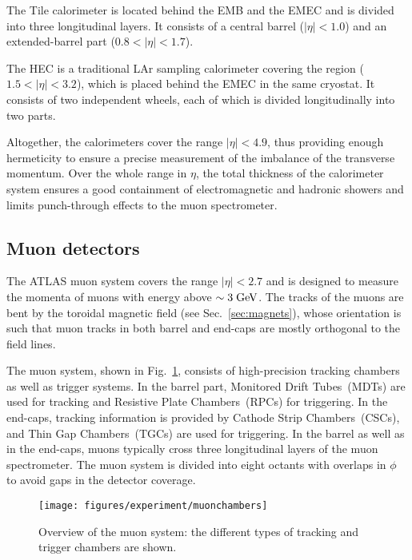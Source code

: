 The Tile calorimeter is located behind the EMB and the EMEC and is divided into three longitudinal layers.
It consists of a central barrel (\mbox{$|\eta| < 1.0$}) and an extended-barrel part (\mbox{$0.8 < |\eta| < 1.7$}).

The HEC is a traditional LAr sampling calorimeter covering the region (\mbox{$1.5 < |\eta| < 3.2$}), which is placed behind the EMEC in the same
cryostat.
It consists of two independent wheels, each of which is divided longitudinally into two parts.

Altogether, the calorimeters cover the range \mbox{$|\eta| < 4.9$},
thus providing enough hermeticity to ensure a precise measurement
of the imbalance of the transverse momentum.
Over the whole range in $\eta$, the total thickness of the calorimeter
system ensures a good containment of
electromagnetic and hadronic showers and limits punch-through effects to the muon spectrometer.

\subsection{Muon detectors}
\label{sec:muonspectrometer}

The ATLAS muon system covers the range \mbox{$|\eta| < 2.7$} and is
designed to measure the momenta of muons with energy above \mbox{$\sim
  3 \; \mathrm{GeV}$}. 
The tracks of the muons are bent by the toroidal magnetic field (see
Sec.~\ref{sec:magnets}), whose orientation is such that muon tracks in
both barrel and end-caps are mostly orthogonal to the field lines.

The muon system, shown in Fig.~\ref{fig:muons}, consists of
high-precision tracking chambers as well as trigger systems.
In the barrel part, Monitored Drift Tubes~(MDTs) are used for tracking
and Resistive Plate Chambers~(RPCs) for triggering.
In the end-caps, tracking information is provided by Cathode Strip
Chambers~(CSCs), and Thin Gap Chambers~(TGCs) are used for
triggering.
In the barrel as well as in the end-caps, muons typically cross three
longitudinal layers of the muon spectrometer.
The muon system is divided into eight octants with overlaps in $\phi$
to avoid gaps in the detector coverage.

\begin{figure}[ht]
\begin{center}
\texttt{[image: figures/experiment/muonchambers]}
\caption[Overview of the muon system]{
  Overview of the muon system:
  the different types of tracking and trigger chambers are shown.}
\label{fig:muons}
\end{center}
\end{figure}

